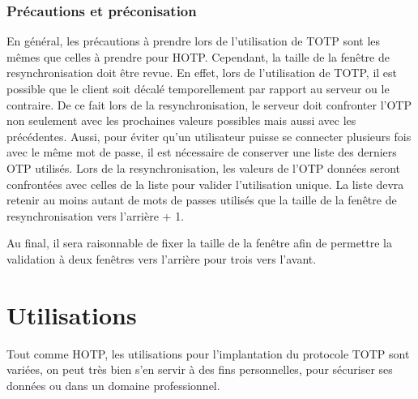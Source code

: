 \documentclass{../res/univ-projet}
\begin{document}
    \subsubsection{Précautions et préconisation}
    En général, les précautions à prendre lors de l'utilisation de TOTP sont les mêmes que celles à prendre pour HOTP. Cependant, la taille de la fenêtre de resynchronisation
    doit être revue. En effet, lors de l'utilisation de TOTP, il est possible que le client soit décalé temporellement par rapport au serveur ou le contraire. De ce fait
    lors de la resynchronisation, le serveur doit confronter l'OTP non seulement avec les prochaines valeurs possibles mais aussi avec les précédentes. Aussi, pour éviter qu'un
    utilisateur puisse se connecter plusieurs fois avec le même mot de passe, il est nécessaire de conserver une liste des derniers OTP utilisés. Lors de la resynchronisation, 
    les valeurs de l'OTP données seront confrontées avec celles de la liste pour valider l'utilisation unique. La liste devra retenir au moins autant de mots de passes utilisés que 
    la taille de la fenêtre de resynchronisation vers l'arrière + 1.
    
    Au final, il sera raisonnable de fixer la taille de la fenêtre afin de permettre la validation à deux fenêtres vers l'arrière pour trois vers l'avant.
    
\section{Utilisations}
Tout comme HOTP, les utilisations pour l'implantation du protocole TOTP sont variées, on peut très bien s'en servir à des fins personnelles, pour sécuriser ses données ou 
dans un domaine professionnel.
\end{document}
